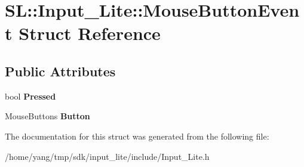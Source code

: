 \hypertarget{struct_s_l_1_1_input___lite_1_1_mouse_button_event}{}\section{SL\+:\+:Input\+\_\+\+Lite\+:\+:Mouse\+Button\+Event Struct Reference}
\label{struct_s_l_1_1_input___lite_1_1_mouse_button_event}
\subsection*{Public Attributes}
\begin{DoxyCompactItemize}
\item 
bool {\bfseries Pressed}\hypertarget{struct_s_l_1_1_input___lite_1_1_mouse_button_event_a5ca776f99e19e5db2616e6dd19654d3b}{}\label{struct_s_l_1_1_input___lite_1_1_mouse_button_event_a5ca776f99e19e5db2616e6dd19654d3b}

\item 
Mouse\+Buttons {\bfseries Button}\hypertarget{struct_s_l_1_1_input___lite_1_1_mouse_button_event_a540392aca45d64708f9ad39c83a70406}{}\label{struct_s_l_1_1_input___lite_1_1_mouse_button_event_a540392aca45d64708f9ad39c83a70406}

\end{DoxyCompactItemize}


The documentation for this struct was generated from the following file\+:\begin{DoxyCompactItemize}
\item 
/home/yang/tmp/sdk/input\+\_\+lite/include/Input\+\_\+\+Lite.\+h\end{DoxyCompactItemize}
